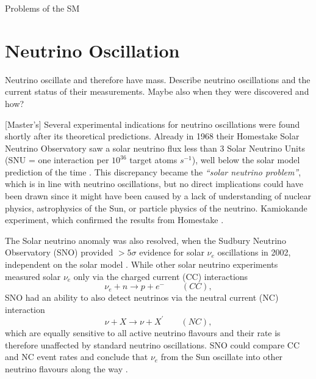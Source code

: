 Problems of the SM


\section{Neutrino Oscillation}
Neutrino oscillate and therefore have mass. Describe neutrino oscillations and the current status of their measurements. Maybe also when they were discovered and how?



[Master's] Several experimental indications for neutrino oscillations were found shortly after its theoretical predictions. Already in 1968 their Homestake Solar Neutrino Observatory saw a solar neutrino flux less than 3 Solar Neutrino Units (SNU = one interaction per $10^{36}$ target atoms $\unit{s^{-1}}$), well below the solar model prediction of the time \cite{Homestake1968.pdf}. This discrepancy became the \textit{“solar neutrino problem”}, which is in line with neutrino oscillations, but no direct implications could have been drawn since it might have been caused by a lack of understanding of nuclear physics, astrophysics of the Sun, or particle physics of the neutrino\cite{GoodmanAdvancesInNeutrinoPhysics.pdf}. Kamiokande experiment, which confirmed the results from Homestake \cite{Kamiokande96.pdf}.

The Solar neutrino anomaly was also resolved, when the Sudbury Neutrino Observatory (SNO) provided $>5\sigma$ evidence for  solar $\nu_e$ oscillations in 2002, independent on the solar model \cite{NCOscInSNOSecondOscResult.pdf}. While other solar neutrino experiments measured solar $\nu_e$ only via the charged current (CC) interactions
\begin{equation}
\nu_e+n\rightarrow p+e^- \qquad (CC),
\end{equation}
SNO had an ability to also detect neutrinos via the neutral current (NC) interaction
\begin{equation}
\nu+X\rightarrow\nu+X^{\prime} \qquad (NC),
\end{equation}
which are equally sensitive to all active neutrino flavours and their rate is therefore unaffected by standard neutrino oscillations. SNO could compare CC and NC event rates and conclude that $\nu_e$ from the Sun oscillate into other neutrino flavours along the way \cite{NCOscInSNOSecondOscResult.pdf}.

